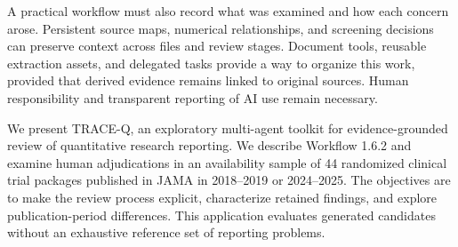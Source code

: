 A practical workflow must also record what was examined and how each concern arose. Persistent source maps, numerical relationships, and screening decisions can preserve context across files and review stages. Document tools, reusable extraction assets, and delegated tasks provide a way to organize this work, provided that derived evidence remains linked to original sources. Human responsibility and transparent reporting of AI use remain necessary.\cite{flanagin2026guidance}

We present TRACE-Q, an exploratory multi-agent toolkit for evidence-grounded review of quantitative research reporting. We describe Workflow 1.6.2 and examine human adjudications in an availability sample of 44 randomized clinical trial packages published in JAMA in 2018--2019 or 2024--2025. The objectives are to make the review process explicit, characterize retained findings, and explore publication-period differences. This application evaluates generated candidates without an exhaustive reference set of reporting problems.
